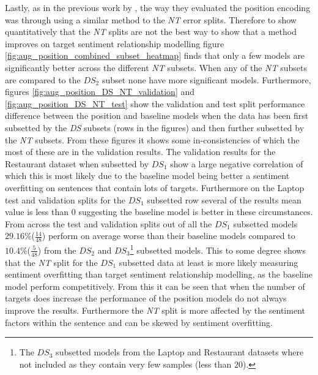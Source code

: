 Lastly, as in the previous work by \citet{he-etal-2018-exploiting}, the way they evaluated the position encoding was through using a similar method to the \textit{NT} error splits. Therefore to show quantitatively that the \textit{NT} splits are not the best way to show that a method improves on target sentiment relationship modelling figure \ref{fig:aug_position_combined_subset_heatmap} finds that only a few models are significantly better across the different \textit{NT} subsets. When any of the \textit{NT} subsets are compared to the $DS_2$ subset none have more significant models. Furthermore, figures \ref{fig:aug_position_DS_NT_validation} and \ref{fig:aug_position_DS_NT_test} show the validation and test split performance difference between the position and baseline models when the data has been first subsetted by the \textit{DS} subsets (rows in the figures) and then further subsetted by the \textit{NT} subsets. From these figures it shows some in-consistencies of which the most of these are in the validation results. The validation results for the Restaurant dataset when subsetted by $DS_1$ show a large negative correlation of which this is most likely due to the baseline model being better a sentiment overfitting on sentences that contain lots of targets. Furthermore on the Laptop test and validation splits for the $DS_1$ subsetted row several of the results mean value is less than $0$ suggesting the baseline model is better in these circumstances. From across the test and validation splits out of all the $DS_1$ subsetted models $29.16\%$($\frac{14}{48}$) perform on average worse than their baseline models compared to $10.4\%$($\frac{5}{48}$) from the $DS_2$ and $DS_3$\footnote{The $DS_3$ subsetted models from the Laptop and Restaurant datasets where not included as they contain very few samples (less than $20$).} subsetted models. This to some degree shows that the \textit{NT} split for the $DS_1$ subsetted data at least is more likely measuring sentiment overfitting than target sentiment relationship modelling, as the baseline model perform competitively. From this it can be seen that when the number of targets does increase the performance of the position models do not always improve the results. Furthermore the \textit{NT} split is more affected by the sentiment factors within the sentence and can be skewed by sentiment overfitting.

